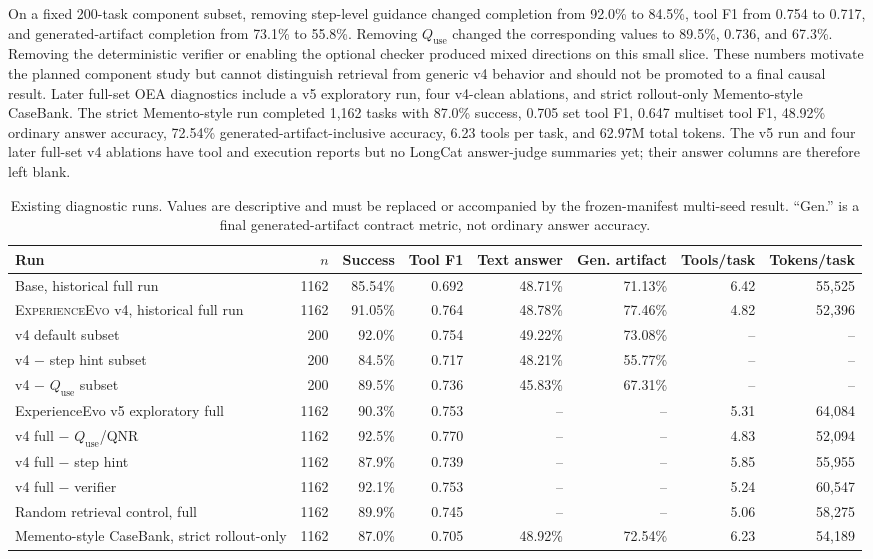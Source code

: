 \documentclass[10pt]{article}
\newcommand{\method}{\textsc{ExperienceEvo}}
\newcommand{\quse}{Q_{\mathrm{use}}}
\begin{document}
On a fixed 200-task component subset, removing step-level guidance changed completion from 92.0\% to 84.5\%, tool F1 from 0.754 to 0.717, and generated-artifact completion from 73.1\% to 55.8\%. Removing $\quse$ changed the corresponding values to 89.5\%, 0.736, and 67.3\%. Removing the deterministic verifier or enabling the optional checker produced mixed directions on this small slice. These numbers motivate the planned component study but cannot distinguish retrieval from generic v4 behavior and should not be promoted to a final causal result. Later full-set OEA diagnostics include a v5 exploratory run, four v4-clean ablations, and strict rollout-only Memento-style CaseBank. The strict Memento-style run completed 1,162 tasks with 87.0\% success, 0.705 set tool F1, 0.647 multiset tool F1, 48.92\% ordinary answer accuracy, 72.54\% generated-artifact-inclusive accuracy, 6.23 tools per task, and 62.97M total tokens. The v5 run and four later full-set v4 ablations have tool and execution reports but no LongCat answer-judge summaries yet; their answer columns are therefore left blank.

\begin{table}[t]
\centering
\caption{Existing diagnostic runs. Values are descriptive and must be replaced or accompanied by the frozen-manifest multi-seed result. ``Gen.'' is a final generated-artifact contract metric, not ordinary answer accuracy.}
\label{tab:diagnostic}
\small
\begin{tabular}{lrrrrrrr}
\toprule
Run & $n$ & Success & Tool F1 & Text answer & Gen. artifact & Tools/task & Tokens/task \\
\midrule
Base, historical full run & 1162 & 85.54\% & 0.692 & 48.71\% & 71.13\% & 6.42 & 55,525 \\
\method{} v4, historical full run & 1162 & 91.05\% & 0.764 & 48.78\% & 77.46\% & 4.82 & 52,396 \\
v4 default subset & 200 & 92.0\% & 0.754 & 49.22\% & 73.08\% & -- & -- \\
v4 $-$ step hint subset & 200 & 84.5\% & 0.717 & 48.21\% & 55.77\% & -- & -- \\
v4 $-$ $\quse$ subset & 200 & 89.5\% & 0.736 & 45.83\% & 67.31\% & -- & -- \\
ExperienceEvo v5 exploratory full & 1162 & 90.3\% & 0.753 & -- & -- & 5.31 & 64,084 \\
v4 full $-$ $\quse$/QNR & 1162 & 92.5\% & 0.770 & -- & -- & 4.83 & 52,094 \\
v4 full $-$ step hint & 1162 & 87.9\% & 0.739 & -- & -- & 5.85 & 55,955 \\
v4 full $-$ verifier & 1162 & 92.1\% & 0.753 & -- & -- & 5.24 & 60,547 \\
Random retrieval control, full & 1162 & 89.9\% & 0.745 & -- & -- & 5.06 & 58,275 \\
Memento-style CaseBank, strict rollout-only & 1162 & 87.0\% & 0.705 & 48.92\% & 72.54\% & 6.23 & 54,189 \\
\bottomrule
\end{tabular}
\end{table}
\end{document}
